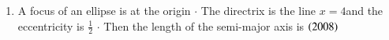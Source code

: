 \documentclass[journal,12pt,twocolumn]{IEEEtran}
\theoremstyle{remark}
\begin{document}
\begin{enumerate}
\begin{enumerate}[label=(\alph*)]
\end{enumerate}
\hfill
\item  A focus of an ellipse is at the origin {$ \cdot $} The directrix is the line {$ x = 4 $}and the eccentricity is {$ \frac{1}{2} $} {$ \cdot $} Then the length of the semi-major axis is 
\hfill
\hfill { $ \left(2008\right) $}
\begin{enumerate}[label=(\alph*)]
\end{enumerate}
\hfill
\end{enumerate}
\end{document}
